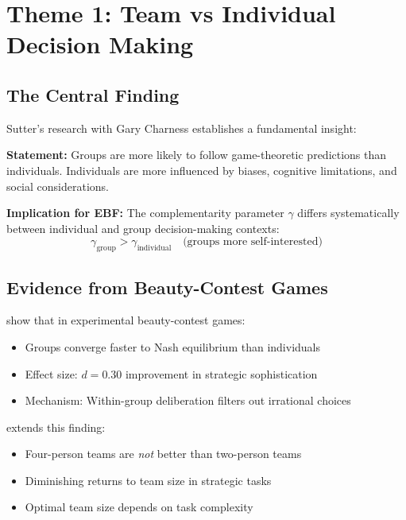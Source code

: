 \section{Theme 1: Team vs Individual Decision Making}
\label{sec:su-team}

\subsection{The Central Finding}
\label{sec:su-groupind}

Sutter's research with Gary Charness \citep{charness2012groups} establishes a fundamental insight:

\begin{tcolorbox}[colback=green!5!white, colframe=green!75!black,
    title=Key Result SU-1: Groups are Less Behavioral]
\textbf{Statement:} Groups are more likely to follow game-theoretic predictions than individuals. Individuals are more influenced by biases, cognitive limitations, and social considerations.

\textbf{Implication for EBF:} The complementarity parameter $\gamma$ differs systematically between individual and group decision-making contexts:
\begin{equation}
\gamma_{\text{group}} > \gamma_{\text{individual}} \quad \text{(groups more self-interested)}
\end{equation}
\end{tcolorbox}

\subsection{Evidence from Beauty-Contest Games}

\citet{kocher2005decision} show that in experimental beauty-contest games:
\begin{itemize}
\item Groups converge faster to Nash equilibrium than individuals
\item Effect size: $d = 0.30$ improvement in strategic sophistication
\item Mechanism: Within-group deliberation filters out irrational choices
\end{itemize}

\citet{sutter2005four} extends this finding:
\begin{itemize}
\item Four-person teams are \textit{not} better than two-person teams
\item Diminishing returns to team size in strategic tasks
\item Optimal team size depends on task complexity
\end{itemize}

